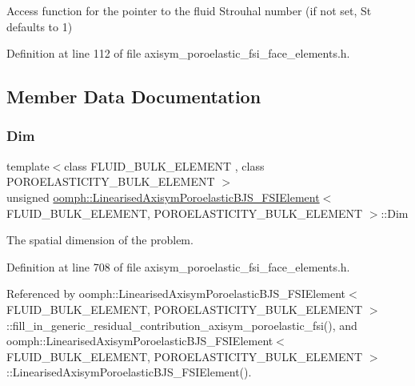 Access function for the pointer to the fluid Strouhal number (if not set, St defaults to 1) 



Definition at line 112 of file axisym\+\_\+poroelastic\+\_\+fsi\+\_\+face\+\_\+elements.\+h.



\subsection{Member Data Documentation}
\mbox{\label{classoomph_1_1LinearisedAxisymPoroelasticBJS__FSIElement_aedc72faae236c037c4bf80efb8899a78}} 
\subsubsection{\texorpdfstring{Dim}{Dim}}
{\footnotesize\ttfamily template$<$class F\+L\+U\+I\+D\+\_\+\+B\+U\+L\+K\+\_\+\+E\+L\+E\+M\+E\+NT , class P\+O\+R\+O\+E\+L\+A\+S\+T\+I\+C\+I\+T\+Y\+\_\+\+B\+U\+L\+K\+\_\+\+E\+L\+E\+M\+E\+NT $>$ \\
unsigned \hyperlink{classoomph_1_1LinearisedAxisymPoroelasticBJS__FSIElement}{oomph\+::\+Linearised\+Axisym\+Poroelastic\+B\+J\+S\+\_\+\+F\+S\+I\+Element}$<$ F\+L\+U\+I\+D\+\_\+\+B\+U\+L\+K\+\_\+\+E\+L\+E\+M\+E\+NT, P\+O\+R\+O\+E\+L\+A\+S\+T\+I\+C\+I\+T\+Y\+\_\+\+B\+U\+L\+K\+\_\+\+E\+L\+E\+M\+E\+NT $>$\+::Dim\hspace{0.3cm}{\ttfamily [private]}}



The spatial dimension of the problem. 



Definition at line 708 of file axisym\+\_\+poroelastic\+\_\+fsi\+\_\+face\+\_\+elements.\+h.



Referenced by oomph\+::\+Linearised\+Axisym\+Poroelastic\+B\+J\+S\+\_\+\+F\+S\+I\+Element$<$ F\+L\+U\+I\+D\+\_\+\+B\+U\+L\+K\+\_\+\+E\+L\+E\+M\+E\+N\+T, P\+O\+R\+O\+E\+L\+A\+S\+T\+I\+C\+I\+T\+Y\+\_\+\+B\+U\+L\+K\+\_\+\+E\+L\+E\+M\+E\+N\+T $>$\+::fill\+\_\+in\+\_\+generic\+\_\+residual\+\_\+contribution\+\_\+axisym\+\_\+poroelastic\+\_\+fsi(), and oomph\+::\+Linearised\+Axisym\+Poroelastic\+B\+J\+S\+\_\+\+F\+S\+I\+Element$<$ F\+L\+U\+I\+D\+\_\+\+B\+U\+L\+K\+\_\+\+E\+L\+E\+M\+E\+N\+T, P\+O\+R\+O\+E\+L\+A\+S\+T\+I\+C\+I\+T\+Y\+\_\+\+B\+U\+L\+K\+\_\+\+E\+L\+E\+M\+E\+N\+T $>$\+::\+Linearised\+Axisym\+Poroelastic\+B\+J\+S\+\_\+\+F\+S\+I\+Element().

